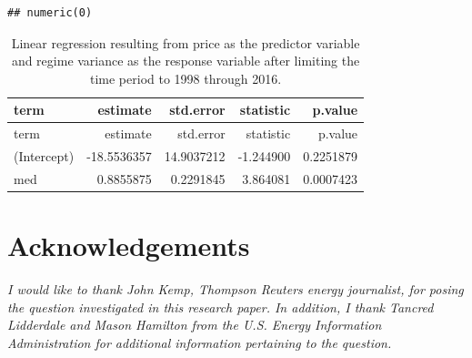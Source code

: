 \documentclass[11pt,]{article}
\begin{document}
\begin{verbatim}
## numeric(0)
\end{verbatim}

\begin{longtable}[]{@{}lrrrr@{}}
\caption{Linear regression resulting from price as the predictor
variable and regime variance as the response variable after limiting the
time period to 1998 through 2016.}\tabularnewline
\toprule
term & estimate & std.error & statistic & p.value\tabularnewline
\midrule
\endfirsthead
\toprule
term & estimate & std.error & statistic & p.value\tabularnewline
\midrule
\endhead
(Intercept) & -18.5536357 & 14.9037212 & -1.244900 &
0.2251879\tabularnewline
med & 0.8855875 & 0.2291845 & 3.864081 & 0.0007423\tabularnewline
\bottomrule
\end{longtable}

\section{Acknowledgements}\label{acknowledgements}

\emph{I would like to thank John Kemp, Thompson Reuters energy
journalist, for posing the question investigated in this research paper.
In addition, I thank Tancred Lidderdale and Mason Hamilton from the U.S.
Energy Information Administration for additional information pertaining
to the question.}
\end{document}
